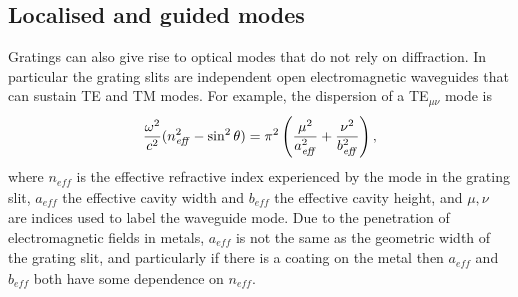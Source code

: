 \subsection{Localised and guided modes}
Gratings can also give rise to optical modes that do not rely on diffraction. In particular the grating slits are independent open electromagnetic waveguides that can sustain TE and TM modes. For example, the dispersion of a TE$_{\mu\nu}$ mode is \cite{Jackson1999}
\begin{equation}
\centering
\frac{\omega^2}{c^2}(n_{\mathit{eff}}^2-\sin^2\theta) = \pi^2\left(\frac{\mu^2}{a_{\mathit{eff}}^2}+\frac{\nu^2}{b_{\mathit{eff}}^2}\right) ,
\label{waveguide}
\end{equation}
where $n_{\mathit{eff}}$ is the effective refractive index experienced by the mode in the grating slit, $a_{\mathit{eff}}$ the effective cavity width and $b_{\mathit{eff}}$ the effective cavity height, and $\mu, \nu$ are indices used to label the waveguide mode. Due to the penetration of electromagnetic fields in metals, $a_{\mathit{eff}}$ is not the same as the geometric width of the grating slit, and particularly if there is a coating on the metal then $a_{\mathit{eff}}$ and $b_{\mathit{eff}}$ both have some dependence on $n_{\mathit{eff}}$. 

